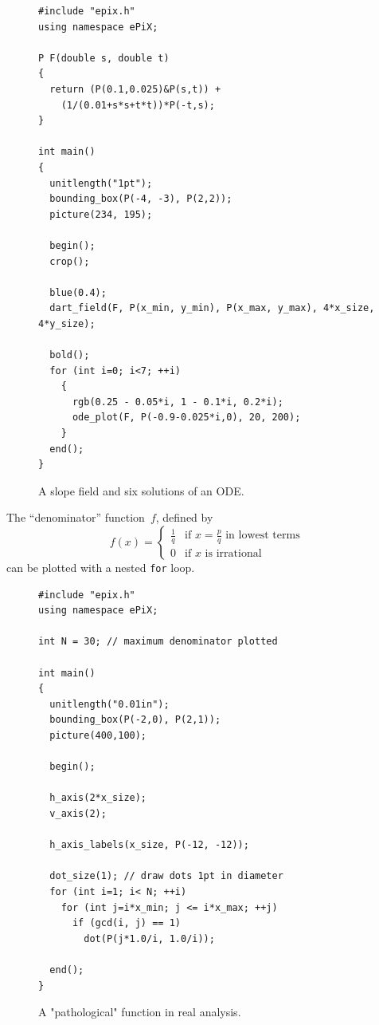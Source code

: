\documentclass[11pt]{article}
\begin{document}
\begin{figure}[ht]
\begin{center}

\vspace*{-180pt}
\begin{verbatim}
#include "epix.h"
using namespace ePiX;

P F(double s, double t)
{
  return (P(0.1,0.025)&P(s,t)) + 
    (1/(0.01+s*s+t*t))*P(-t,s);
}

int main() 
{
  unitlength("1pt");
  bounding_box(P(-4, -3), P(2,2));
  picture(234, 195);

  begin();
  crop();

  blue(0.4);
  dart_field(F, P(x_min, y_min), P(x_max, y_max), 4*x_size, 4*y_size);

  bold();
  for (int i=0; i<7; ++i)
    {
      rgb(0.25 - 0.05*i, 1 - 0.1*i, 0.2*i);
      ode_plot(F, P(-0.9-0.025*i,0), 20, 200);
    }
  end();
}

\end{verbatim}
\caption{A slope field and six solutions of an ODE.}
\label{fig:slopefield}
\end{center}
\end{figure}

\clearpage

\noindent The ``denominator'' function~$f$, defined by
\begin{equation*}
f(x)=\begin{cases}
\frac{1}{q} & \text{if $x=\frac{p}{q}$ in lowest terms} \\
0 & \text{if $x$~is irrational}
\end{cases}
\end{equation*}
can be plotted with a nested \texttt{for} loop.

\begin{figure}[hbt]
\begin{center}

\vfil

\begin{verbatim}
#include "epix.h"
using namespace ePiX;

int N = 30; // maximum denominator plotted

int main() 
{
  unitlength("0.01in");
  bounding_box(P(-2,0), P(2,1));
  picture(400,100);

  begin();   

  h_axis(2*x_size);
  v_axis(2);

  h_axis_labels(x_size, P(-12, -12));

  dot_size(1); // draw dots 1pt in diameter
  for (int i=1; i< N; ++i) 
    for (int j=i*x_min; j <= i*x_max; ++j) 
      if (gcd(i, j) == 1) 
        dot(P(j*1.0/i, 1.0/i));

  end();
}

\end{verbatim}
\caption{A "pathological" function in real analysis.}
\label{fig:denom}
\end{center}
\end{figure}
\end{document}
